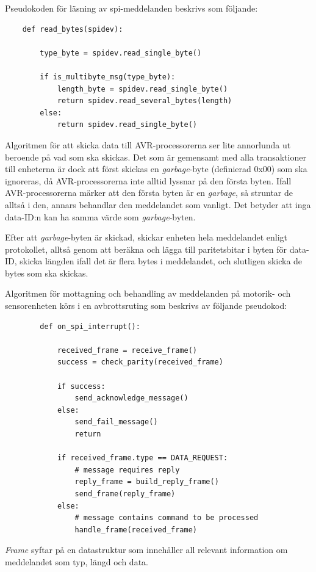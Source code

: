 \documentclass[a4paper,titlepage,12pt]{article}
\begin{document}
    Pseudokoden för läsning av spi-meddelanden beskrivs som följande:

	\begin{lstlisting}
	def read_bytes(spidev):

		type_byte = spidev.read_single_byte()

        if is_multibyte_msg(type_byte):
            length_byte = spidev.read_single_byte()
            return spidev.read_several_bytes(length)
        else:
            return spidev.read_single_byte()

	\end{lstlisting}

	Algoritmen för att skicka data till AVR-processorerna ser lite annorlunda
    ut beroende på vad som ska skickas. Det som är gemensamt med alla
    transaktioner till enheterna är dock att först skickas en \textit{garbage}-byte
    (definierad 0x00) som ska ignoreras,
    då AVR-processorerna inte alltid lyssnar på den första 
    byten. Ifall AVR-processorerna märker att den första byten är en
    \textit{garbage}, så struntar de alltså i den, annars behandlar den
    meddelandet som vanligt. Det betyder att inga data-ID:n kan ha samma
    värde som \textit{garbage}-byten.

    Efter att \textit{garbage}-byten är skickad, skickar enheten hela
    meddelandet enligt protokollet, alltså genom att beräkna och lägga till
    paritetsbitar i byten för data-ID, skicka längden ifall det är flera bytes
    i meddelandet, och slutligen skicka de bytes som ska skickas.

	Algoritmen för mottagning och behandling av meddelanden på motorik- och
    sensorenheten körs i en avbrottsruting som beskrivs av följande pseudokod:

	\begin{lstlisting}
        def on_spi_interrupt():
			
            received_frame = receive_frame()
            success = check_parity(received_frame)

            if success:
                send_acknowledge_message()
            else:
                send_fail_message()
                return

            if received_frame.type == DATA_REQUEST:
                # message requires reply
                reply_frame = build_reply_frame()
                send_frame(reply_frame)
            else:
                # message contains command to be processed
                handle_frame(received_frame)

	\end{lstlisting}
    \textit{Frame} syftar på en datastruktur som innehåller all relevant
    information om meddelandet som typ, längd och data.
\end{document}
